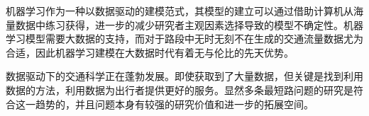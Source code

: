 机器学习作为一种以数据驱动的建模范式，其模型的建立可以通过借助计算机从海量数据中练习获得，进一步的减少研究者主观因素选择导致的模型不确定性。机器学习模型需要大数据的支持，而对于路段中无时无刻不在生成的交通流量数据尤为合适，因此机器学习建模在大数据时代有着无与伦比的先天优势。

数据驱动下的交通科学正在蓬勃发展。即使获取到了大量数据，但关键是找到利用数据的方法，利用数据为出行者提供更好的服务。显然多条最短路问题的研究是符合这一趋势的，并且问题本身有较强的研究价值和进一步的拓展空间。

